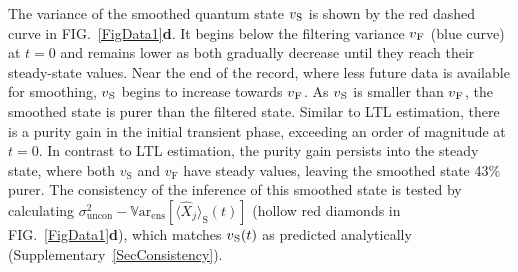 \documentclass[aps,prx,twocolumn,amsmath,amssymb,superscriptaddress,floatfix,longbibliography
]{revtex4-2}
\begin{document}
The variance of the smoothed quantum state $v{_{\text S}}$ is shown by the red dashed curve in FIG.~\ref{FigData1}\textbf{d}. It begins below the filtering variance $v{_{\text F}}$ (blue curve) at $t=0$ and remains lower as both gradually decrease until they reach their steady-state values. Near the end of the record, where less future data is available for smoothing, $v{_{\text S}}$ begins to increase towards $v{_{\text F}}$. As $v{_{\text S}}$ is smaller than $v{_{\text F}}$, the smoothed state is purer than the filtered state. Similar to LTL estimation, there is a purity gain in the initial transient phase, exceeding an order of magnitude at $t=0$. In contrast to LTL estimation, the purity gain persists into the steady state, where both $v_\text{S}$ and $v_\text{F}$ have steady values, leaving the smoothed state 43\% purer. The consistency of the inference of this smoothed state is tested by calculating $\sigma^2_\text{uncon}-\mathbb{V}\text{ar}_{\text{ens}} [\langle\hat{X}_j\rangle_\text{S}(t)]$  (hollow red diamonds in FIG.~\ref{FigData1}\textbf{d}), which matches $v{_{\text S}}(t)$ as predicted analytically (Supplementary~\ref{SecConsistency}).
\end{document}
